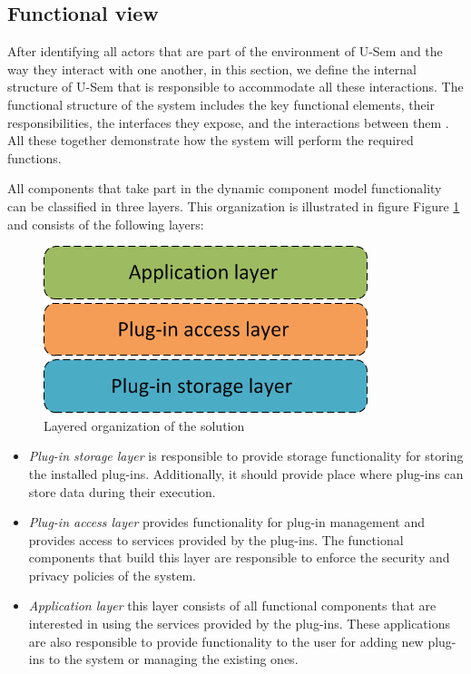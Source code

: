 \subsection{Functional view}

After identifying all actors that are part of the environment of U-Sem and the way they interact with one another, in this section, we define the internal structure of U-Sem that is responsible to accommodate all these interactions. The functional structure of the system includes the key functional elements, their responsibilities, the interfaces they expose, and the interactions between them \cite{rozanski2011software}. All these together demonstrate how the system will perform the required functions.

All components that take part in the dynamic component model functionality can be classified in three layers. This organization is illustrated in figure Figure \ref{fig_layer} and consists of the following layers:

\begin{figure}[h!]
  \centering
  	\includegraphics[scale=0.6]{plug-in/layers/layers.png}
  \caption{Layered organization of the solution}
  \label{fig_layer}
\end{figure}

\begin{itemize}
	\item \textit{Plug-in storage layer} is responsible to provide storage functionality for storing the installed plug-ins. Additionally, it should provide place where plug-ins can store data during their execution.
	\item \textit{Plug-in access layer} provides functionality for plug-in management and provides access to services provided by the plug-ins. The functional components that build this layer are responsible to enforce the security and privacy policies of the system.
	\item \textit{Application layer} this layer consists of all functional components that are interested in using the services provided by the plug-ins. These applications are also responsible to provide functionality to the user for adding new plug-ins to the system or managing the existing ones. 
	\end{itemize}

